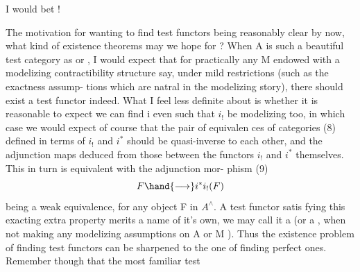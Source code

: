 
I would bet !

The motivation for wanting to find test functors being reasonably
clear by now,  what kind of existence theorems may we hope for ? When
A is such a beautiful test category as \hand{$\Delta$,$\Box$} or \hand{\unsure{$\bigcirc$}} ,  I would expect
that for practically any M endowed with a modelizing contractibility
structure say,  under mild  restrictions  (such as the exactness assump-%
tions which are natral in the modelizing story),  there should exist a
test functor indeed.  What I feel less definite about is whether it is
reasonable to expect we can find i even such that $i_{!}$ be modelizing too,
in which case we would expect of course that the pair of  equivalen%
ces of categories
(8)
defined in terms of $i_{!}$ and $i^{*}$ should be quasi-inverse to each other,
and the adjunction maps deduced from those between the functors $i_{!}$ and
$i^{*}$ themselves.  This  in turn is equivalent with the adjunction mor-%
phism
(9)
\[ F \hand{\longrightarrow} i^{*}i_{!}(F) \]
being a weak equivalence,  for any object F in $A^{\wedge}$.  A test functor satis%
fying this exacting extra property merits a name of it's own,  we may
call it a \hand{\uline{\textcolor{black}{perfect}}} \hand{\uline{\textcolor{black}{test}}} \hand{\uline{\textcolor{black}{functor}}}  (or a \hand{\uline{\textcolor{black}{perfect}}} \hand{\uline{\textcolor{black}{aspheric}}} \hand{\uline{\textcolor{black}{functor}}} ,  when
not making any modelizing assumptions on A or M ).  Thus the existence
problem of finding test functors can be sharpened to the one of finding
perfect ones.  Remember though that the  most familiar test
